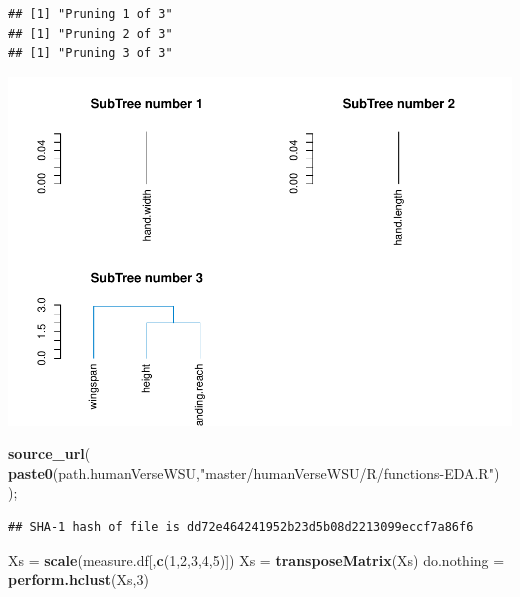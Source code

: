 \documentclass[]{article}
\newenvironment{Shaded}{\begin{snugshade}}{\end{snugshade}}
\newcommand{\DecValTok}[1]{\textcolor[rgb]{0.00,0.00,0.81}{#1}}
\newcommand{\KeywordTok}[1]{\textcolor[rgb]{0.13,0.29,0.53}{\textbf{#1}}}
\newcommand{\NormalTok}[1]{#1}
\newcommand{\StringTok}[1]{\textcolor[rgb]{0.31,0.60,0.02}{#1}}
\begin{document}
\begin{verbatim}
## [1] "Pruning 1 of 3"
## [1] "Pruning 2 of 3"
## [1] "Pruning 3 of 3"
\end{verbatim}

\includegraphics{project-measure-writeup_files/figure-latex/hclust-nba-3.pdf}

\begin{Shaded}
\begin{Highlighting}[]
\KeywordTok{source\_url}\NormalTok{( }\KeywordTok{paste0}\NormalTok{(path.humanVerseWSU,}\StringTok{"master/humanVerseWSU/R/functions{-}EDA.R"}\NormalTok{) );}
\end{Highlighting}
\end{Shaded}

\begin{verbatim}
## SHA-1 hash of file is dd72e464241952b23d5b08d2213099eccf7a86f6
\end{verbatim}

\begin{Shaded}
\begin{Highlighting}[]
\NormalTok{Xs =}\StringTok{ }\KeywordTok{scale}\NormalTok{(measure.df[,}\KeywordTok{c}\NormalTok{(}\DecValTok{1}\NormalTok{,}\DecValTok{2}\NormalTok{,}\DecValTok{3}\NormalTok{,}\DecValTok{4}\NormalTok{,}\DecValTok{5}\NormalTok{)])}
\NormalTok{Xs =}\StringTok{ }\KeywordTok{transposeMatrix}\NormalTok{(Xs)}
\NormalTok{do.nothing =}\StringTok{ }\KeywordTok{perform.hclust}\NormalTok{(Xs,}\DecValTok{3}\NormalTok{) }
\end{Highlighting}
\end{Shaded}
\end{document}
